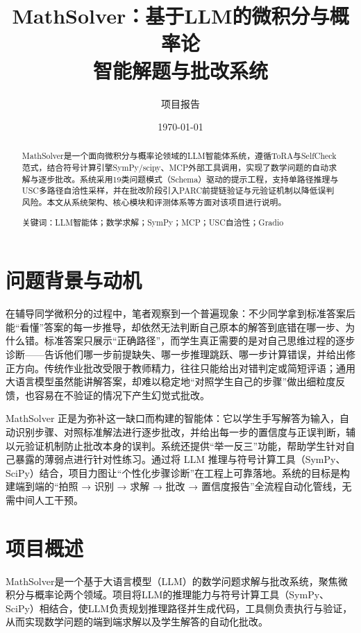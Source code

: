 \documentclass[12pt,a4paper]{ctexart}
\title{MathSolver：基于LLM的微积分与概率论\\智能解题与批改系统}
\author{项目报告}
\date{\today}
\begin{document}
\maketitle

\begin{abstract}
\noindent MathSolver是一个面向微积分与概率论领域的LLM智能体系统，遵循ToRA与SelfCheck范式，结合符号计算引擎SymPy/scipy、MCP外部工具调用，实现了数学问题的自动求解与逐步批改。系统采用19类问题模式（Schema）驱动的提示工程，支持单路径推理与USC多路径自洽性采样，并在批改阶段引入PARC前提链验证与元验证机制以降低误判风险。本文从系统架构、核心模块和评测体系等方面对该项目进行说明。

关键词：LLM智能体；数学求解；SymPy；MCP；USC自洽性；Gradio
\end{abstract}

\section{问题背景与动机}

在辅导同学微积分的过程中，笔者观察到一个普遍现象：不少同学拿到标准答案后能“看懂”答案的每一步推导，却依然无法判断自己原本的解答到底错在哪一步、为什么错。标准答案只展示“正确路径”，而学生真正需要的是对自己思维过程的逐步诊断——告诉他们哪一步前提缺失、哪一步推理跳跃、哪一步计算错误，并给出修正方向。传统作业批改受限于教师精力，往往只能给出对错判定或简短评语；通用大语言模型虽然能讲解答案，却难以稳定地“对照学生自己的步骤”做出细粒度反馈，也容易在不验证的情况下产生幻觉式批改。

MathSolver 正是为弥补这一缺口而构建的智能体：它以学生手写解答为输入，自动识别步骤、对照标准解法进行逐步批改，并给出每一步的置信度与正误判断，辅以元验证机制防止批改本身的误判。系统还提供“举一反三”功能，帮助学生针对自己暴露的薄弱点进行针对性练习。通过将 LLM 推理与符号计算工具（SymPy、SciPy）结合，项目力图让“个性化步骤诊断”在工程上可靠落地。系统的目标是构建端到端的“拍照 → 识别 → 求解 → 批改 → 置信度报告”全流程自动化管线，无需中间人工干预。

\section{项目概述}

MathSolver是一个基于大语言模型（LLM）的数学问题求解与批改系统，聚焦微积分与概率论两个领域。项目将LLM的推理能力与符号计算工具（SymPy、SciPy）相结合，使LLM负责规划推理路径并生成代码，工具侧负责执行与验证，从而实现数学问题的端到端求解以及学生解答的自动化批改。
\end{document}
